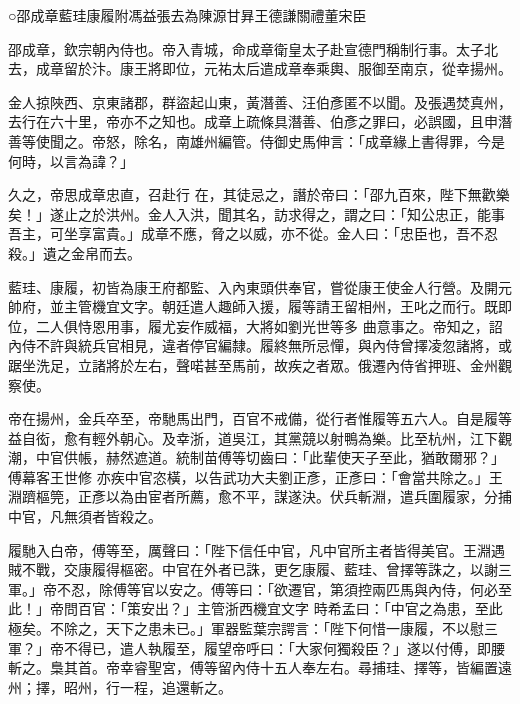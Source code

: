 
\begin{pinyinscope}

 ○邵成章藍珪康履附馮益張去為陳源甘昪王德謙關禮董宋臣



 邵成章，欽宗朝內侍也。帝入青城，命成章衛皇太子赴宣德門稱制行事。太子北去，成章留於汴。康王將即位，元祐太后遣成章奉乘輿、服御至南京，從幸揚州。



 金人掠陜西、京東諸郡，群盜起山東，黃潛善、汪伯彥匿不以聞。及張遇焚真州，去行在六十里，帝亦不之知也。成章上疏條具潛善、伯彥之罪曰，必誤國，且申潛善等使聞之。帝怒，除名，南雄州編管。侍御史馬伸言：「成章緣上書得罪，今是何時，以言為諱？」



 久之，帝思成章忠直，召赴行
 在，其徒忌之，譖於帝曰：「邵九百來，陛下無歡樂矣！」遂止之於洪州。金人入洪，聞其名，訪求得之，謂之曰：「知公忠正，能事吾主，可坐享富貴。」成章不應，脅之以威，亦不從。金人曰：「忠臣也，吾不忍殺。」遺之金帛而去。



 藍珪、康履，初皆為康王府都監、入內東頭供奉官，嘗從康王使金人行營。及開元帥府，並主管機宜文字。朝廷遣人趣師入援，履等請王留相州，王叱之而行。既即位，二人俱恃恩用事，履尤妄作威福，大將如劉光世等多
 曲意事之。帝知之，詔內侍不許與統兵官相見，違者停官編隸。履終無所忌憚，與內侍曾擇凌忽諸將，或踞坐洗足，立諸將於左右，聲喏甚至馬前，故疾之者眾。俄遷內侍省押班、金州觀察使。



 帝在揚州，金兵卒至，帝馳馬出門，百官不戒備，從行者惟履等五六人。自是履等益自衒，愈有輕外朝心。及幸浙，道吳江，其黨競以射鴨為樂。比至杭州，江下觀潮，中官供帳，赫然遮道。統制苗傅等切齒曰：「此輩使天子至此，猶敢爾邪？」傅幕客王世修
 亦疾中官恣橫，以告武功大夫劉正彥，正彥曰：「會當共除之。」王淵躋樞筦，正彥以為由宦者所薦，愈不平，謀遂決。伏兵斬淵，遣兵圍履家，分捕中官，凡無須者皆殺之。



 履馳入白帝，傅等至，厲聲曰：「陛下信任中官，凡中官所主者皆得美官。王淵遇賊不戰，交康履得樞密。中官在外者已誅，更乞康履、藍珪、曾擇等誅之，以謝三軍。」帝不忍，除傅等官以安之。傅等曰：「欲遷官，第須控兩匹馬與內侍，何必至此！」帝問百官：「策安出？」主管浙西機宜文字
 時希孟曰：「中官之為患，至此極矣。不除之，天下之患未已。」軍器監葉宗諤言：「陛下何惜一康履，不以慰三軍？」帝不得已，遣人執履至，履望帝呼曰：「大家何獨殺臣？」遂以付傅，即腰斬之。梟其首。帝幸睿聖宮，傅等留內侍十五人奉左右。尋捕珪、擇等，皆編置遠州；擇，昭州，行一程，追還斬之。




\end{pinyinscope}
